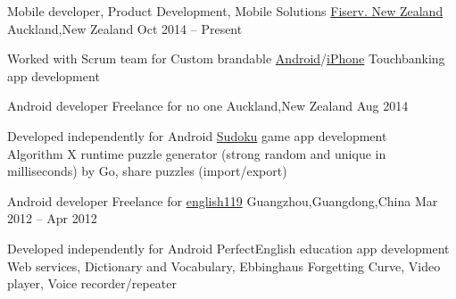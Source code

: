 
\begin{cventries}
	\cventry
	{Mobile developer, Product Development, Mobile Solutions}
	{\href{https://www.careers.fiserv.com/new-zealand}{Fiserv. New Zealand}}
	{Auckland,\enskip New Zealand}
	{Oct 2014 – Present}
	{
		\begin{cvitems}
			\item {Worked with Scrum team for Custom brandable \href{https://play.google.com/store/apps/details?id=com.fiserv.touchbankingasp&hl=en}{Android}/\href{https://itunes.apple.com/us/app/touchbanking/id386678211?mt=8}{iPhone} Touchbanking app development}
		\end{cvitems}
	}
\end{cventries}

\begin{cventries}
	\cventry
	{Android developer}
	{Freelance for no one}
	{Auckland,\enskip New Zealand}
	{Aug 2014}
	{
		\begin{cvitems}
			\item {Developed independently for Android \href{https://play.google.com/store/apps/details?id=com.gmail.jiangyang5157.sudoku}{Sudoku} game app development\\
			Algorithm X runtime puzzle generator (strong random and unique in milliseconds) by Go, share puzzles (import/export)}
		\end{cvitems}
	}
\end{cventries}

\begin{cventries}
	\cventry
	{Android developer}
	{Freelance for \href{http://www.english119.cn}{english119}}
	{Guangzhou,\enskip Guangdong,\enskip China}
	{Mar 2012 – Apr 2012}
	{
		\begin{cvitems}
			\item {Developed independently for Android PerfectEnglish education app development\\
				Web services, Dictionary and Vocabulary, Ebbinghaus Forgetting Curve, Video player, Voice recorder/repeater}
		\end{cvitems}
	}
\end{cventries}

